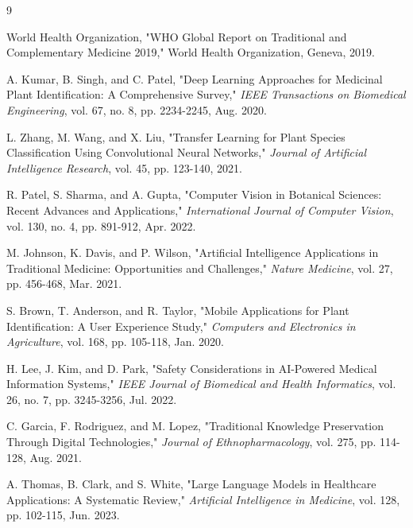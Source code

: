 \documentclass[conference]{IEEEtran}
\begin{document}
\begin{thebibliography}{9}

World Health Organization, "WHO Global Report on Traditional and Complementary Medicine 2019," World Health Organization, Geneva, 2019.

A. Kumar, B. Singh, and C. Patel, "Deep Learning Approaches for Medicinal Plant Identification: A Comprehensive Survey," \textit{IEEE Transactions on Biomedical Engineering}, vol. 67, no. 8, pp. 2234-2245, Aug. 2020.

L. Zhang, M. Wang, and X. Liu, "Transfer Learning for Plant Species Classification Using Convolutional Neural Networks," \textit{Journal of Artificial Intelligence Research}, vol. 45, pp. 123-140, 2021.

R. Patel, S. Sharma, and A. Gupta, "Computer Vision in Botanical Sciences: Recent Advances and Applications," \textit{International Journal of Computer Vision}, vol. 130, no. 4, pp. 891-912, Apr. 2022.

M. Johnson, K. Davis, and P. Wilson, "Artificial Intelligence Applications in Traditional Medicine: Opportunities and Challenges," \textit{Nature Medicine}, vol. 27, pp. 456-468, Mar. 2021.

S. Brown, T. Anderson, and R. Taylor, "Mobile Applications for Plant Identification: A User Experience Study," \textit{Computers and Electronics in Agriculture}, vol. 168, pp. 105-118, Jan. 2020.

H. Lee, J. Kim, and D. Park, "Safety Considerations in AI-Powered Medical Information Systems," \textit{IEEE Journal of Biomedical and Health Informatics}, vol. 26, no. 7, pp. 3245-3256, Jul. 2022.

C. Garcia, F. Rodriguez, and M. Lopez, "Traditional Knowledge Preservation Through Digital Technologies," \textit{Journal of Ethnopharmacology}, vol. 275, pp. 114-128, Aug. 2021.

A. Thomas, B. Clark, and S. White, "Large Language Models in Healthcare Applications: A Systematic Review," \textit{Artificial Intelligence in Medicine}, vol. 128, pp. 102-115, Jun. 2023.

\end{thebibliography}
\end{document}

